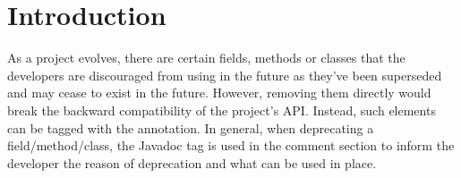 \documentclass[runningheads,a4paper]{llncs}
\begin{document}






\section{Introduction}

As a project evolves, there are certain fields, methods or classes
that the developers are discouraged from using in the future as
they've been superseded and may cease to exist in the future.
However, removing them directly would break the backward compatibility
of the project's API.  Instead, such elements can be tagged with the
 annotation.  In general, when deprecating a
field/method/class, the  Javadoc tag is used in the
comment section to inform the developer the reason of deprecation and
what can be used in place.



\end{document}
